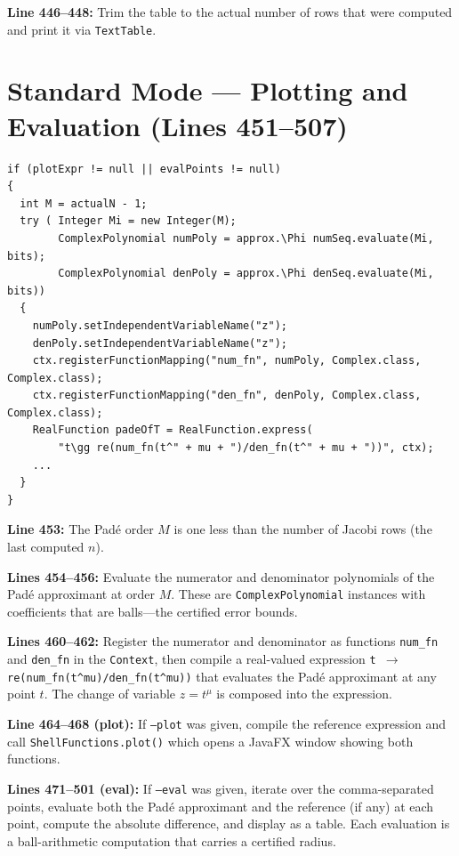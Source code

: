 \documentclass[a4paper,11pt]{article}
\begin{document}
\textbf{Line 446--448:} Trim the table to the actual number of rows that were
computed and print it via \texttt{TextTable}.

\section{Standard Mode --- Plotting and Evaluation (Lines 451--507)}

\begin{lstlisting}[firstnumber=451]
if (plotExpr != null || evalPoints != null)
{
  int M = actualN - 1;
  try ( Integer Mi = new Integer(M);
        ComplexPolynomial numPoly = approx.\Phi numSeq.evaluate(Mi, bits);
        ComplexPolynomial denPoly = approx.\Phi denSeq.evaluate(Mi, bits))
  {
    numPoly.setIndependentVariableName("z");
    denPoly.setIndependentVariableName("z");
    ctx.registerFunctionMapping("num_fn", numPoly, Complex.class, Complex.class);
    ctx.registerFunctionMapping("den_fn", denPoly, Complex.class, Complex.class);
    RealFunction padeOfT = RealFunction.express(
        "t\gg re(num_fn(t^" + mu + ")/den_fn(t^" + mu + "))", ctx);
    ...
  }
}
\end{lstlisting}

\textbf{Line 453:} The Pad\'e order $M$ is one less than the number of
Jacobi rows (the last computed $n$).

\textbf{Lines 454--456:} Evaluate the numerator and denominator polynomials of
the Pad\'e approximant at order $M$. These are \texttt{ComplexPolynomial}
instances with coefficients that are balls---the certified error bounds.

\textbf{Lines 460--462:} Register the numerator and denominator as functions
\texttt{num\_fn} and \texttt{den\_fn} in the \texttt{Context}, then compile a
real-valued expression \texttt{t $\rightarrow$ re(num\_fn(t\textasciicircum mu)/den\_fn(t\textasciicircum mu))}
that evaluates the Pad\'e approximant at any point $t$. The change of variable
$z = t^{\mu}$ is composed into the expression.

\textbf{Line 464--468 (plot):} If \texttt{--plot} was given, compile the
reference expression and call \texttt{ShellFunctions.plot()} which opens a
JavaFX window showing both functions.

\textbf{Lines 471--501 (eval):} If \texttt{--eval} was given, iterate over the
comma-separated points, evaluate both the Pad\'e approximant and the reference
(if any) at each point, compute the absolute difference, and display as a
table. Each evaluation is a ball-arithmetic computation that carries a
certified radius.
\end{document}
